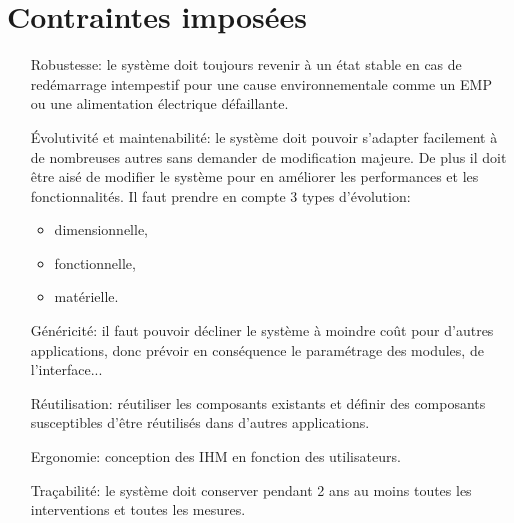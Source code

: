 
\section{Contraintes imposées}

    \begin{itemize}
        \item[Robustesse:] le système doit toujours revenir à un état
            stable en cas de redémarrage intempestif pour une cause
            environnementale comme un EMP ou une alimentation électrique
            défaillante.
    
        \item[Évolutivité et maintenabilité:] le système doit pouvoir
            s'adapter facilement à de nombreuses autres sans demander de
            modification majeure.
            De plus il doit être aisé de modifier le système pour en
            améliorer les performances et les fonctionnalités.
            Il faut prendre en compte 3 types d'évolution:
            \begin{itemize}
                \item dimensionnelle,
                \item fonctionnelle,
                \item matérielle.
            \end{itemize}

        \item[Généricité:] il faut pouvoir décliner le système à moindre
            coût pour d'autres applications, donc prévoir en conséquence
            le paramétrage des modules, de l'interface...

        \item[Réutilisation:] réutiliser les composants existants et
            définir des composants susceptibles d'être réutilisés dans
            d'autres applications.

        \item[Ergonomie:] conception des IHM en fonction des utilisateurs.

        \item[Traçabilité:] le système doit conserver pendant 2 ans au
            moins toutes les interventions et toutes les mesures.
    \end{itemize}
